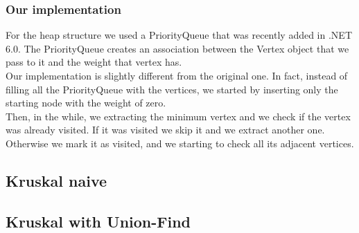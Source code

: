 \subsubsection{Our implementation}
For the heap structure we used a PriorityQueue that was recently added in .NET 6.0.
The PriorityQueue creates an association between the Vertex object that we pass to it and the weight that vertex has.\\
Our implementation is slightly different from the original one. In fact, instead of filling all the PriorityQueue with 
the vertices, we started by inserting only the starting node with the weight of zero.\\
Then, in the while, we extracting the minimum vertex and we check if the vertex was already visited.
If it was visited we skip it and we extract another one.
Otherwise we mark it as visited, and we starting to check all its adjacent vertices.

\subsection{Kruskal naive}
\subsection{Kruskal with Union-Find}
